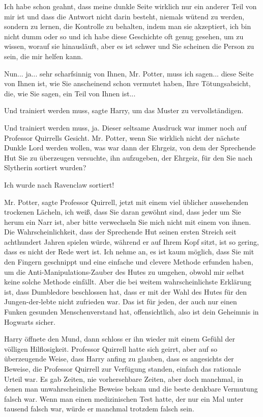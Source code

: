 \glqq Ich habe schon geahnt, dass meine dunkle Seite wirklich nur ein anderer
Teil von mir ist und dass die Antwort nicht darin besteht, niemals wütend zu
werden, sondern zu lernen, die Kontrolle zu behalten, indem man sie akzeptiert,
ich bin nicht dumm oder so und ich habe diese Geschichte oft genug gesehen, um
zu wissen, worauf sie hinausläuft, aber es ist schwer und Sie scheinen die
Person zu sein, die mir helfen kann.\grqq{}

\glqq Nun... ja... sehr scharfsinnig von Ihnen, Mr. Potter, muss ich sagen...
diese Seite von Ihnen ist, wie Sie anscheinend schon vermutet haben, Ihre
Tötungsabsicht, die, wie Sie sagen, ein Teil von Ihnen ist...\grqq{}

\glqq Und trainiert werden muss\grqq{}, sagte Harry, um das Muster zu
vervollständigen.

\glqq Und trainiert werden muss, ja.\grqq{} Dieser seltsame Ausdruck war immer
noch auf Professor Quirrells Gesicht. \glqq Mr. Potter, wenn Sie wirklich nicht
der nächste Dunkle Lord werden wollen, was war dann der Ehrgeiz, von dem der
Sprechende Hut Sie zu überzeugen versuchte, ihn aufzugeben, der Ehrgeiz, für den
Sie nach Slytherin sortiert wurden?\grqq{}

\glqq Ich wurde nach Ravenclaw sortiert!\grqq{}

\glqq Mr. Potter\grqq{}, sagte Professor Quirrell, jetzt mit einem viel
üblicher aussehenden trockenen Lächeln, \glqq ich weiß, dass Sie daran gewöhnt
sind, dass jeder um Sie herum ein Narr ist, aber bitte verwechseln Sie mich
nicht mit einem von ihnen. Die Wahrscheinlichkeit, dass der Sprechende Hut
seinen ersten Streich seit achthundert Jahren spielen würde, während er auf
Ihrem Kopf sitzt, ist so gering, dass es nicht der Rede wert ist. Ich nehme an,
es ist kaum möglich, dass Sie mit den Fingern geschnippt und eine einfache und
clevere Methode erfunden haben, um die Anti-Manipulations-Zauber des Hutes zu
umgehen, obwohl mir selbst keine solche Methode einfällt. Aber die bei weitem
wahrscheinlichste Erklärung ist, dass Dumbledore beschlossen hat, dass er mit
der Wahl des Hutes für den Jungen-der-lebte nicht zufrieden war. Das ist für
jeden, der auch nur einen Funken gesunden Menschenverstand hat, offensichtlich,
also ist dein Geheimnis in Hogwarts sicher.\grqq{}

Harry öffnete den Mund, dann schloss er ihn wieder mit einem Gefühl der völligen
Hilflosigkeit. Professor Quirrell hatte sich geirrt, aber auf so überzeugende
Weise, dass Harry anfing zu glauben, dass es angesichts der Beweise, die
Professor Quirrell zur Verfügung standen, einfach das rationale Urteil war. Es
gab Zeiten, nie vorhersehbare Zeiten, aber doch manchmal, in denen man
unwahrscheinliche Beweise bekam und die beste denkbare Vermutung falsch war.
Wenn man einen medizinischen Test hatte, der nur ein Mal unter tausend falsch
war, würde er manchmal trotzdem falsch sein.

